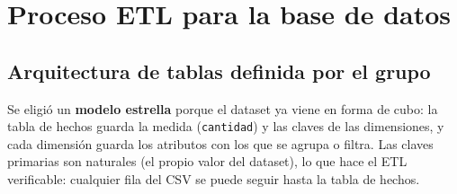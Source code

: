\section{Proceso ETL para la base de datos}

\subsection{Arquitectura de tablas definida por el grupo}
Se eligi\'o un \textbf{modelo estrella} porque el dataset ya viene en forma de cubo: la tabla de
hechos guarda la medida (\texttt{cantidad}) y las claves de las dimensiones, y cada dimensi\'on
guarda los atributos con los que se agrupa o filtra. Las claves primarias son naturales
(el propio valor del dataset), lo que hace el ETL verificable: cualquier fila del CSV se puede
seguir hasta la tabla de hechos.

